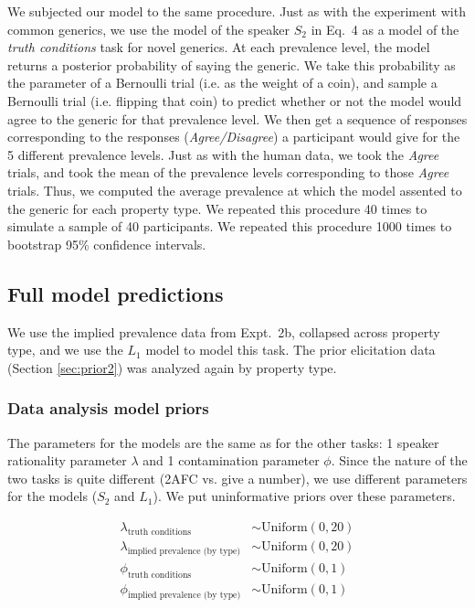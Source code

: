 \documentclass[10pt,letterpaper]{article}
\begin{document}
We subjected our model to the same procedure. 
Just as with the experiment with common generics, we use the model of the speaker $S_2$ in Eq.~4 as a model of the \emph{truth conditions} task for novel generics.
At each prevalence level, the model returns a posterior probability of saying the generic. 
We take this probability as the parameter of a Bernoulli trial (i.e. as the weight of a coin), and sample a Bernoulli trial (i.e. flipping that coin) to predict whether or not the model would agree to the generic for that prevalence level. 
We then get a sequence of responses corresponding to the responses (\emph{Agree/Disagree}) a participant would give for the 5 different prevalence levels.
Just as with the human data, we took the \emph{Agree} trials, and took the mean of the prevalence levels corresponding to those \emph{Agree} trials. 
Thus, we computed the average prevalence at which the model assented to the generic for each property type. 
We repeated this procedure 40 times to simulate a sample of 40 participants. 
We repeated this procedure 1000 times to bootstrap 95\% confidence intervals.


\subsection{Full model predictions}


We use the implied prevalence data from Expt.~2b, collapsed across property type, and we use the $L_1$ model to model this task. 
The prior elicitation data (Section \ref{sec:prior2}) was analyzed again by property type.


\subsubsection{Data analysis model priors}

The parameters for the models are the same as for the other tasks: 1 speaker rationality parameter $\lambda$ and 1 contamination parameter $\phi$. 
Since the nature of the two tasks is quite different (2AFC vs. give a number), we use different parameters for the models ($S_2$ and $L_1$).
We put uninformative priors over these parameters.

\begin{align*}
\lambda_{\text{truth conditions}} & \sim \text{Uniform}(0, 20) \\
\lambda_{\text{implied prevalence (by type)}} & \sim \text{Uniform}(0, 20) \\
\phi_{\text{truth conditions}} & \sim \text{Uniform}(0,1) \\ 
\phi_{\text{implied prevalence (by type)}} & \sim \text{Uniform}(0,1)
\end{align*}
\end{document}
